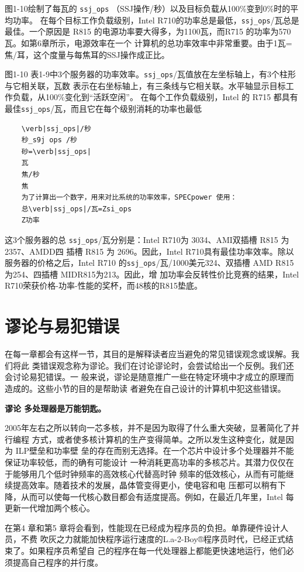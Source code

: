 图1-10绘制了每瓦的 \verb|ssj_ops| （SSJ操作/秒）以及目标负载从100\%变到0\%时的平均功率。
在每个目标工作负载级别，Intel R710的功率总是最低，\verb|ssj_ops|/瓦总是最佳。一个原因是 R815
的电源功率要大得多，为1100瓦，而R715 的功率为570瓦。如第6章所示，电源效率在一个
计算机的总功率效率中非常重要。由于1瓦=焦/耳，这个度量与每焦耳的SSJ操作成正比。

图1-10
表1-9中3个服务器的功率效率。\verb|ssj_ops|/瓦值放在左坐标轴上，有3个柱形与它相关联，瓦数
表示在右坐标轴上，有三条线与它相关联。水平轴显示目标工作负载，从100\%变化到“活跃空闲”。
在每个工作负载级别，Intel 的 R715 都具有最佳\verb|ssj_ops|/瓦，而且它在每个级别消耗的功率也最低
\begin{verbatim}
    \verb|ssj_ops|/秒
    秒_s9j ops /秒
    砂=\verb|ssj_ops|
    瓦
    焦/秒
    焦
    为了计算出一个数字，用来对比系统的功率效率，SPECpower 使用：
    总\verb|ssj_ops|/瓦=Zsi_ops
    Z功率
\end{verbatim}

这3个服务器的总 \verb|ssj_ops|/瓦分别是：Intel R710为 3034、AMI双插槽 R815 为2357、AMDD四
插槽 R815 为 2696。因此，Intel R710具有最佳功率效率。除以服务器的价格之后，Intel R710
的\verb|ssj_ops|/瓦/1000美元324、双插槽 AMD R815为254、四插槽 MIDR815为213。因此，增
加功率会反转性价比竞赛的结果，Intel R710荣获价格-功率-性能的奖杯，而48核的R815垫底。

\section{谬论与易犯错误}
在每一章都会有这样一节，其目的是解释读者应当避免的常见错误观念或误解。我们将此
类错误观念称为谬论。我们在讨论谬论时，会尝试给出一个反例。我们还会讨论易犯错误。一
般来说，谬论是随意推广一些在特定环境中才成立的原理而造成的。这些小节的目的是帮助读
者避免在自己设计的计算机中犯这些错误。

\textbf{谬论 多处理器是万能钥匙。}

2005年左右之所以转向一芯多核，并不是因为取得了什么重大突破，显著简化了并行编程
方式，或者使多核计算机的生产变得简单。之所以发生这种变化，就是因为 ILP壁垒和功率壁
垒的存在而别无选择。在一个芯片中设计多个处理器并不能保证功率较低，而的确有可能设计
一种消耗更高功率的多核芯片。其潜力仅仅在于能够用几个低时钟频率的高效核心代替高时钟
频率的低效核心，从而有可能继续提高效率。随着技术的发展，晶体管变得更小，使电容和电
压都可以稍有下降，从而可以使每一代核心数目都会有适度提高。例如，在最近几年里，Intel
每更新一代增加两个核心。

在第4 章和第5 章将会看到，性能现在已经成为程序员的负担。单靠硬件设计人员，不费
吹灰之力就能加快程序运行速度的L.a-2-Boy®程序员时代，已经正式结束了。如果程序员希望自
己的程序在每一代处理器上都能更快速地运行，他们必须提高自己程序的并行度。

